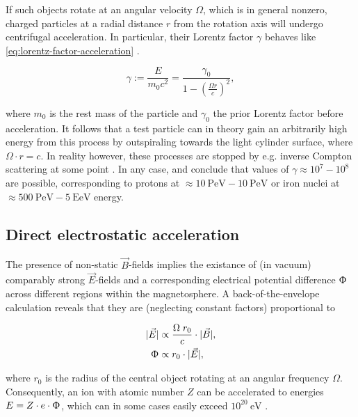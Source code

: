 If such objects rotate at an angular velocity $\Omega$, which is in general nonzero, charged particles at a radial distance $r$ from the rotation axis will undergo
centrifugal acceleration. In particular, their Lorentz factor $\gamma$ behaves like \autoref{eq:lorentz-factor-acceleration} \cite{rieger1999particle}.

\begin{equation}
\label{eq:lorentz-factor-acceleration}
\gamma := \frac{E}{m_0 c^2} = \frac{\gamma_0}{1 - \left(\frac{\Omega r}{c}\right)^2},
\end{equation}

where $m_0$ is the rest mass of the particle and $\gamma_0$ the prior Lorentz factor before acceleration. It follows that a test particle can in theory gain an
arbitrarily high energy from this process by outspiraling towards the light cylinder surface, where $\Omega\cdot r = c$. In reality however, these processes are
stopped by e.g. inverse Compton scattering at some point \cite{osmanov2007efficiency}. In any case, \cite{rieger1999particle} and \cite{osmanov2007efficiency}
conclude that values of $\gamma \approx 10^7-10^8$ are possible, corresponding to protons at $\approx\SI{10}{\peta\electronvolt}-\SI{10}{\peta\electronvolt}$ or 
iron nuclei at $\approx\SI{500}{\peta\electronvolt}-\SI{5}{\exa\electronvolt}$ energy.

\subsection{Direct electrostatic acceleration}
\label{ssec:cr-electrostatic-acceleration}

The presence of non-static $\vec{B}$-fields implies the existance of (in vacuum) comparably strong $\vec{E}$-fields and a corresponding electrical potential 
difference $\Upphi$ across different regions within the magnetosphere. A back-of-the-envelope calculation reveals that they are (neglecting constant factors) 
proportional to

\begin{align}
|\vec{E}| &\propto \frac{\Omega\;r_0}{c} \cdot |\vec{B}|, \\
\Upphi &\propto r_0 \cdot |\vec{E}|,
\end{align}

where $r_0$ is the radius of the central object rotating at an angular frequency $\Omega$. Consequently, an ion with atomic number $Z$ can be accelerated to 
energies $E = Z \cdot e \cdot \Upphi$, which can in some cases easily exceed $10^{20}\SI{}{\electronvolt}$ \cite{rieger2009cosmic}. 

